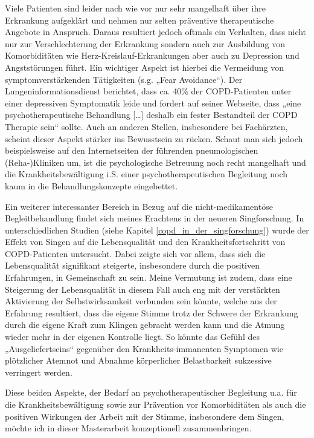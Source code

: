 Viele Patienten sind leider nach wie vor nur sehr mangelhaft über ihre Erkrankung aufgeklärt und nehmen nur selten präventive therapeutische Angebote in Anspruch. Daraus resultiert jedoch oftmals ein Verhalten, dass nicht nur zur Verschlechterung der Erkrankung sondern auch zur Ausbildung von Komorbiditäten wie Herz-Kreislauf-Erkrankungen aber auch zu Depression und Angststörungen führt. Ein wichtiger Aspekt ist hierbei die Vermeidung von symptomverstärkenden Tätigkeiten (s.g. „Fear Avoidance“). Der Lungeninformationsdienst  berichtet, dass ca. 40\% der COPD-Patienten unter einer depressiven Symptomatik leide und fordert auf seiner Webseite, dass „eine psychotherapeutische Behandlung […] deshalb ein fester Bestandteil der COPD Therapie sein“ sollte. Auch an anderen Stellen, insbesondere bei Fachärzten, scheint dieser Aspekt stärker ins Bewusstsein zu rücken. Schaut man sich jedoch beispielsweise auf den Internetseiten der führenden pneumologischen (Reha-)Kliniken um, ist die psychologische Betreuung noch recht mangelhaft und die Krankheitsbewältigung i.S. einer psychotherapeutischen Begleitung noch kaum in die Behandlungskonzepte eingebettet. 

Ein weiterer interessanter Bereich in Bezug auf die nicht-medikamentöse Begleitbehandlung findet sich meines Erachtens in der neueren Singforschung. In unterschiedlichen Studien (siehe Kapitel \ref{copd_in_der_singforschung}) wurde der Effekt von Singen auf die Lebensqualität und den Krankheitsfortschritt von COPD-Patienten untersucht. Dabei zeigte sich vor allem, dass sich die Lebensqualität signifikant steigerte, insbesondere durch die positiven Erfahrungen, in Gemeinschaft zu sein. Meine Vermutung ist zudem, dass eine Steigerung der Lebensqualität in diesem Fall auch eng mit der verstärkten Aktivierung der Selbstwirksamkeit verbunden sein könnte, welche aus der Erfahrung resultiert, dass die eigene Stimme trotz der Schwere der Erkrankung durch die eigene Kraft zum Klingen gebracht werden kann und die Atmung wieder mehr in der eigenen Kontrolle liegt. So könnte das Gefühl des „Ausgeliefertseins“ gegenüber den Krankheits-immanenten Symptomen wie plötzlicher Atemnot und Abnahme körperlicher Belastbarkeit  sukzessive verringert werden.

Diese beiden Aspekte, der Bedarf an psychotherapeutischer Begleitung u.a. für die Krankheitsbewältigung sowie zur Prävention vor Komorbiditäten als auch die positiven Wirkungen der Arbeit mit der Stimme, insbesondere dem Singen, möchte ich in dieser Masterarbeit konzeptionell zusammenbringen.

